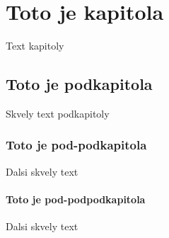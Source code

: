 
\chapter{Toto je kapitola}
Text kapitoly

\section{Toto je podkapitola}
Skvely text podkapitoly

\subsection{Toto je pod-podkapitola}
Dalsi skvely text

\subsubsection{Toto je pod-podpodkapitola}
Dalsi skvely text